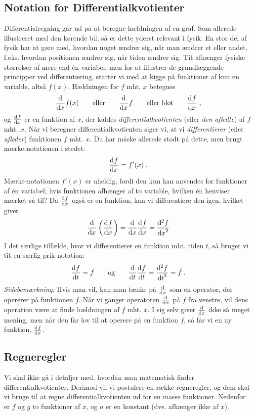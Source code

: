 \subsection{Notation for Differentialkvotienter}
Differentialregning går ud på at beregne hældningen af en graf. Som
allerede illustreret med den kørende bil, så er dette yderst relevant
i fysik. En stor del af fysik har at gøre med, hvordan noget ændrer
sig, når man ændrer et eller andet, f.eks. hvordan positionen ændrer
sig, når tiden ændrer sig. Tit afhænger fysiske størrelser af mere end
én variabel, men for at illustrer de grundlæggende principper ved differentiering, starter vi med at kigge på funktioner af kun en variable, altså $f(x)$. Hældningen for $f$ mht. $x$ betegnes
\begin{align*}
\dif{x}{}f(x)
\qquad
\text{eller}
\qquad
\dif{x}{}f
\qquad
\text{eller blot}
\qquad
\dif{x}{f} \; ,
\end{align*}
og $\dif{x}{f}$ er en funktion af $x$, der kaldes \emph{differentialkvotienten} (eller \emph{den afledte}) af $f$ mht. $x$. Når vi beregner differentialkvotienten
siger vi, at vi \emph{differentierer} (eller \emph{afleder})
funktionen $f$ mht. $x$. Du har måske allerede stødt på dette, men
brugt mærke-notationen i stedet:
\begin{align*}
\dif{x}{f} = f'(x) \; .
\end{align*}
Mærke-notationen $f'(x)$ er uheldig, fordi den kun kan anvendes for
funktioner af én variabel; hvis funktionen afhænger af to variable,
hvilken én henviser mærket så til? Da $\dif{x}{f}$ også er en funktion,
kan vi differentiere den igen, hvilket giver
\begin{align*}
\dif{x}{} \left(\dif{x}{f}\right)
= \dif{x}{} \dif{x}{f}
= \dif[2]{x}{f}
\end{align*}
I det særlige tilfælde, hvor vi differentierer en funktion mht. tiden
$t$, så bruger vi tit en særlig prik-notation:
\begin{align*}
\dif{t}{f} = \dt{f}
\qquad
\text{og}
\qquad
\dif{t}{} \dif{t}{f} = \dif[2]{t}{f} = \ddt{f} \; .
\end{align*}
\textsl{Sidebemærkning:} Hvis man vil, kan man tænke på $\dif{x}{}$ som
en operator, der opererer på funktionen $f$. Når vi ganger operatoren
$\dif{x}{}$ på $f$ fra venstre, vil dens operation være at finde
hældningen af $f$ mht. $x$. I sig selv giver $\dif{x}{}$ ikke så meget
mening, men når den får lov til at operere på en funktion $f$, så får
vi en ny funktion, $\dif{x}{f}$.

\subsection{Regneregler}
Vi skal ikke gå i detaljer med, hvordan man matematisk finder
differentialkvotienter. Derimod vil vi postulere en række regneregler,
og dem skal vi bruge til at regne differentialkvotienten ud for en
masse funktioner. Nedenfor er $f$ og $g$ to funktioner af $x$, og $a$ er en
konstant (dvs. afhænger ikke af $x$).

